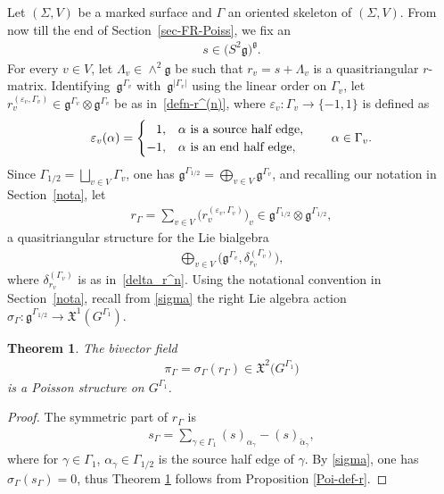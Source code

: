 \documentclass[pdftex]{sigma}
\numberwithin{equation}{section}
\newtheorem{Theorem}{Theorem}[section]
\newcommand{\XX}{\mathfrak{X}}
\def \g {\mathfrak{a}}
\def \g {\mathfrak{g}}
\def \sGam {{\scriptscriptstyle \Gamma}}
\newcommand{\calpha}{\check{\alpha}}
\begin{document}
Let $(\Sigma, V)$ be a marked surface and $\Gamma$ an oriented skeleton of $(\Sigma, V)$. From now till the end of Section~\ref{sec-FR-Poiss}, we f\/ix an
\begin{gather*}
s \in \big(S^2\g\big)^\g.
\end{gather*}
For every $v \in V$, let $\Lambda_v \in \wedge^2 \g$ be such that $r_v = s + \Lambda_v$ is a quasitriangular $r$-matrix. Identi\-fying~$\g^{\sGam_v}$ with~$\g^{|\sGam_v|}$ using the linear order on $\Gamma_v$, let $r_v^{(\varepsilon_v, \sGam_v)} \in \g^{\sGam_v} \otimes \g^{\sGam_v}$ be as in~\eqref{defn-r^(n)}, where $\varepsilon_v\colon \Gamma_v \to \{ -1, 1\}$ is def\/ined as
\begin{gather*}
\varepsilon_v(\alpha) = \begin{cases}
\hphantom{-}1, & \alpha \ \text{is a source half edge}, \\
-1, & \alpha \ \text{is an end half edge},
\end{cases} \qquad \alpha \in \Gamma_v.
\end{gather*}
Since $\Gamma_{1/2} = \bigsqcup_{v \in V} \Gamma_v$, one has $\g^{\sGam_{1/2}} = \bigoplus_{v \in V} \g^{\sGam_v}$, and recalling our notation in Section~\ref{nota}, let
\begin{gather}
r_{\sGam} = \sum_{v \in V} \big( r_v^{(\varepsilon_v, \sGam_v)} \big)_v \in \g^{\sGam_{1/2}} \otimes \g^{\sGam_{1/2}}, \label{defn-r_sgam}
\end{gather}
a quasitriangular structure for the Lie bialgebra
\begin{gather*}
\bigoplus_{v \in V} \big( \g^{\sGam_v}, \delta_{r_v}^{(\sGam_v)} \big), %
\end{gather*}
where $\delta_{r_v}^{(\sGam_v)}$ is as in~\eqref{delta_r^n}. Using the notational convention in Section~\ref{nota}, recall from \eqref{sigma} the right Lie algebra action $\sigma_{\sGam}\colon \g^{\sGam_{1/2}} \to \XX^1(G^{\Gamma_1})$.

\begin{Theorem} \label{main-thm}
The bivector field
\begin{gather*}
\pi_{\sGam} = \sigma_{\sGam}(r_{\sGam}) \in \XX^2\big(G^{\Gamma_1}\big) %
\end{gather*}
is a Poisson structure on $G^{\Gamma_1}$.
\end{Theorem}

\begin{proof}
The symmetric part of $r_{\sGam}$ is
\begin{gather*}
s_{\sGam} = \sum_{\gamma \in \Gamma_1} (s)_{\alpha_\gamma} - (s)_{\calpha_\gamma},
\end{gather*}
where for $\gamma \in \Gamma_1$, $\alpha_\gamma \in \Gamma_{1/2}$ is the source half edge of $\gamma$. By \eqref{sigma}, one has $\sigma_{\sGam} (s_{\sGam}) = 0$, thus Theorem \ref{main-thm} follows from Proposition \ref{Poi-def-r}.
\end{proof}
\end{document}
